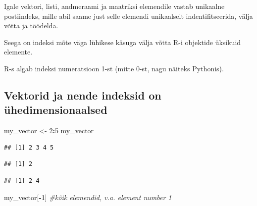 \documentclass[]{book}
\newenvironment{Shaded}{\begin{snugshade}}{\end{snugshade}}
\newcommand{\KeywordTok}[1]{\textcolor[rgb]{0.13,0.29,0.53}{\textbf{#1}}}
\newcommand{\DecValTok}[1]{\textcolor[rgb]{0.00,0.00,0.81}{#1}}
\newcommand{\StringTok}[1]{\textcolor[rgb]{0.31,0.60,0.02}{#1}}
\newcommand{\CommentTok}[1]{\textcolor[rgb]{0.56,0.35,0.01}{\textit{#1}}}
\newcommand{\OperatorTok}[1]{\textcolor[rgb]{0.81,0.36,0.00}{\textbf{#1}}}
\newcommand{\NormalTok}[1]{#1}
\begin{document}
Igale vektori, listi, andmeraami ja maatriksi elemendile vastab
unikaalne postiindeks, mille abil saame just selle elemendi unikaalselt
indentifitseerida, välja võtta ja töödelda.

Seega on indeksi mõte väga lühikese käsuga välja võtta R-i objektide
üksikuid elemente.

R-s algab indeksi numeratsioon 1-st (mitte 0-st, nagu näiteks Pythonis).

\subsection{Vektorid ja nende indeksid on
ühedimensionaalsed}\label{vektorid-ja-nende-indeksid-on-uhedimensionaalsed}

\begin{Shaded}
\begin{Highlighting}[]
\NormalTok{my_vector <-}\StringTok{ }\DecValTok{2}\OperatorTok{:}\DecValTok{5} 
\NormalTok{my_vector}
\end{Highlighting}
\end{Shaded}

\begin{verbatim}
## [1] 2 3 4 5
\end{verbatim}

\begin{Shaded}
\end{Shaded}

\begin{verbatim}
## [1] 2
\end{verbatim}

\begin{Shaded}
\end{Shaded}

\begin{verbatim}
## [1] 2 4
\end{verbatim}

\begin{Shaded}
\begin{Highlighting}[]
\NormalTok{my_vector[}\OperatorTok{-}\DecValTok{1}\NormalTok{] }\CommentTok{#kõik elemendid, v.a. element number 1}
\end{Highlighting}
\end{Shaded}
\end{document}

